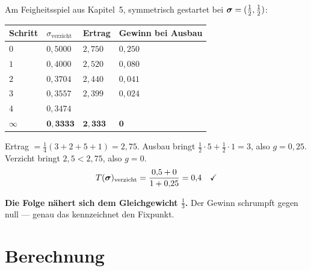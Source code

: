 \begin{merksatz}
Am Feigheitsspiel aus Kapitel~5, symmetrisch gestartet bei $\boldsymbol{\sigma} = (\tfrac12,\tfrac12)$:

\begin{center}
{\small
\renewcommand{\arraystretch}{1.5}
\begin{tabular}{@{}P{1.4cm}P{2.0cm}P{2.0cm}P{2.4cm}@{}}
\toprule
\textbf{Schritt} & $\sigma_{\text{verzicht}}$ & \textbf{Ertrag} & \textbf{Gewinn bei Ausbau}\\
\midrule
$0$ & $0{,}5000$ & $2{,}750$ & $0{,}250$\\
$1$ & $0{,}4000$ & $2{,}520$ & $0{,}080$\\
$2$ & $0{,}3704$ & $2{,}440$ & $0{,}041$\\
$3$ & $0{,}3557$ & $2{,}399$ & $0{,}024$\\
$4$ & $0{,}3474$ & & \\
\midrule
$\infty$ & $\mathbf{0{,}3333}$ & $\mathbf{2{,}333}$ & $\mathbf{0}$\\
\bottomrule
\end{tabular}}
\end{center}

 Ertrag $= \tfrac14(3+2+5+1) = 2{,}75$. Ausbau bringt $\tfrac12\cdot5+\tfrac12\cdot1 = 3$, also $g = 0{,}25$. Verzicht bringt $2{,}5 < 2{,}75$, also $g = 0$.
\[ T(\boldsymbol{\sigma})_{\text{verzicht}} = \frac{0{,}5+0}{1+0{,}25} = 0{,}4 \quad \checkmark \]

\begin{center}
\begin{minipage}{0.9\textwidth}
\textbf{Die Folge nähert sich dem Gleichgewicht $\tfrac13$.} Der Gewinn schrumpft gegen null --- genau das kennzeichnet den Fixpunkt.
\end{minipage}
\end{center}

\begin{center}
\begin{minipage}{0.88\textwidth}
\end{minipage}
\end{center}
\end{merksatz}

\section{Berechnung}

